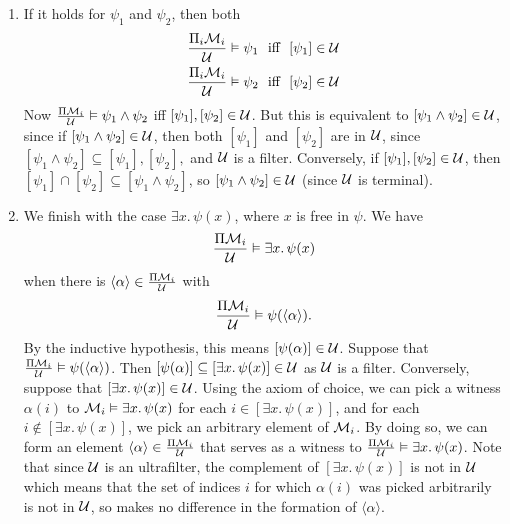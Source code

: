 \documentclass{article}
\numberwithin{thm}{subsection}
\begin{document}
\begin{enumerate}
    \item[Conjunction.] If it holds for $\psi_{1}$ and $\psi_{2}$, then both \begin{align*}
        \frac{\Pi_{i}\mathcal{M}_{i}}{\mathcal{U}} &\vDash \psi_{1} \,\,\,\, \text{iff} \,\,\,\, [\psi_{1}] \in \mathcal{U}\\
        \frac{\Pi_{i}\mathcal{M}_{i}}{\mathcal{U}} &\vDash \psi_{2} \,\,\,\, \text{iff} \,\,\,\, [\psi_{2}] \in \mathcal{U}
    \end{align*}
    Now $\frac{\Pi \mathcal{M}_{i}}{\mathcal{U}} \vDash \psi_{1} \wedge \psi_{2}$ iff $[\psi_{1}],[\psi_{2}] \in \mathcal{U}$. But this is equivalent to $[\psi_{1} \wedge \psi_{2}] \in \mathcal{U}$, since if $[\psi_{1} \wedge \psi_{2}] \in \mathcal{U}$, then both $[\psi_{1}]$ and $[\psi_{2}]$ are in $\mathcal{U}$, since $[\psi_{1} \wedge \psi_{2}] \subseteq [\psi_{1}],[\psi_{2}],$ and $\mathcal{U}$ is a filter. Conversely, if $[\psi_{1}],[\psi_{2}] \in \mathcal{U}$, then $[\psi_{1}] \cap [\psi_{2}] \subseteq [\psi_{1} \wedge \psi_{2}]$, so $[\psi_{1} \wedge \psi_{2}] \in \mathcal{U}$ (since $\mathcal{U}$ is terminal).
    \item[Existential quantification.] We finish with the case $\exists x. \, \psi(x)$, where $x$ is free in $\psi$. We have \[\frac{\Pi \mathcal{M}_{i}}{\mathcal{U}} \vDash \exists x. \, \psi(x)\] when there is $\langle \alpha \rangle \in \frac{\Pi \mathcal{M}_{i}}{\mathcal{U}}$ with \[\frac{\Pi \mathcal{M}_{i}}{\mathcal{U}} \vDash \psi(\langle \alpha \rangle).\] By the inductive hypothesis, this means $[\psi(\alpha)] \in \mathcal{U}$. \gap
    Suppose that $\frac{\Pi \mathcal{M}_{i}}{\mathcal{U}} \vDash \psi(\langle \alpha \rangle)$. Then $[\psi(\alpha)] \subseteq [\exists x. \, \psi(x)] \in \mathcal{U}$ as $\mathcal{U}$ is a filter.
    Conversely, suppose that $[\exists x.\, \psi(x)] \in \mathcal{U}$. Using the axiom of choice, we can pick a witness $\alpha(i)$ to $\mathcal{M}_{i} \vDash \exists x.\, \psi(x)$ for each $i \in [\exists x. \, \psi(x)]$, and for each $i \notin [\exists x.\, \psi(x)]$, we pick an arbitrary element of $\mathcal{M}_{i}$. By doing so, we can form an element $\langle \alpha \rangle \in \frac{\Pi \mathcal{M}_{i}}{\mathcal{U}}$ that serves as a witness to $\frac{\Pi \mathcal{M}_{i}}{\mathcal{U}} \vDash \exists x. \, \psi(x)$. \gap 
    Note that since $\mathcal{U}$ is an ultrafilter, the complement of $[\exists x. \, \psi(x)]$ is not in $\mathcal{U}$ which means that the set of indices $i$ for which $\alpha(i)$ was picked arbitrarily is not in $\mathcal{U}$, so makes no difference in the formation of $\langle \alpha \rangle$.
\end{enumerate}
\end{document}
